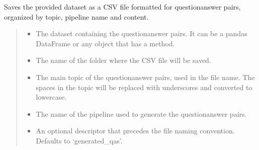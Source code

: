 \documentclass[letterpaper,10pt,english,openany,oneside]{sphinxmanual}
\begin{document}
\begin{fulllineitems}
\label{\detokenize{utils:tools.pipeline.save_qa_pairs}}
\pysigstartsignatures
{}
\pysigstopsignatures
\sphinxAtStartPar
Saves the provided dataset as a CSV file formatted for question\sphinxhyphen{}answer pairs,
organized by topic, pipeline name and content.
\begin{quote}\begin{description}
\begin{itemize}
\item {} 
\sphinxAtStartPar
{} \textendash{} The dataset containing the question\sphinxhyphen{}answer pairs. It can be a pandas DataFrame
or any object that has a  method.

\item {} 
\sphinxAtStartPar
{} \textendash{} The name of the folder where the CSV file will be saved.

\item {} 
\sphinxAtStartPar
{} \textendash{} The main topic of the question\sphinxhyphen{}answer pairs, used in the file name.
The spaces in the topic will be replaced with underscores and converted to lowercase.

\item {} 
\sphinxAtStartPar
{} \textendash{} The name of the pipeline used to generate the question\sphinxhyphen{}answer pairs.

\item {} 
\sphinxAtStartPar
{} \textendash{} An optional descriptor that precedes the file naming convention.
Defaults to ‘generated\_qas’.


\end{itemize}
\end{description}
\end{quote}
\end{fulllineitems}
\end{document}
